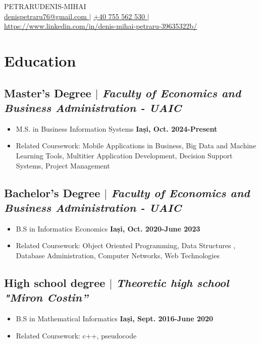 \documentclass[11pt]{article}
\begin{document}
\begin{center}
    {\fontsize{36}{36}\selectfont\interthin PETRARU\interheavy DENIS-MIHAI} \\ \bigskip
    {\color{icnclr}\faEnvelope[regular]} \href{mailto:hi@example.com}{denispetraru76@gmail.com  } $|$ 
    {\color{icnclr}} \href{tel:1234567890}{+40 755 562 530  } $|$
    {\color{icnclr}\faLinkedinIn} \href{https://www.linkedin.com/}{https://www.linkedin.com/in/denis-mihai-petraru-39635322b/}
\end{center}

\section{Education}
\subsection{Master's Degree $|$ {\normalfont\textit{Faculty of Economics and Business Administration - UAIC  }} }
\begin{itemize}
    \item M.S. in Business Information Systems \hfill \textbf{Iași, Oct. 2024-Present}
    \item Related Coursework: Mobile Applications in Business, Big Data and Machine Learning Tools, Multitier Application Development, Decision Support Systems, Project Management 
\end{itemize}
\subsection{Bachelor's Degree $|$ {\normalfont\textit{Faculty of Economics and Business Administration - UAIC  }} }
\begin{itemize}
    \item B.S in Informatics Economics \hfill \textbf{Iași, Oct. 2020-June 2023}
    \item Related Coursework: Object Oriented Programming, Data Structures , Database Administration, Computer Networks, Web Technologies 
\end{itemize}

\subsection{ High school degree $|$ {\normalfont\textit{Theoretic high school "Miron Costin”    }}}
\begin{itemize}
    \item B.S in Mathematical Informatics   \textbf{\hfill Iași, Sept. 2016-June 2020}
    \item Related Coursework: c++, pseudocode
\end{itemize}
\end{document}
